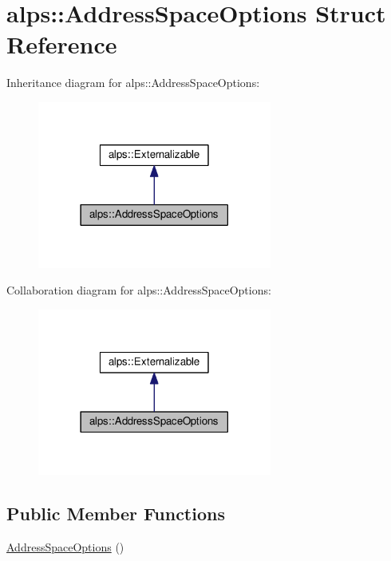 \hypertarget{structalps_1_1AddressSpaceOptions}{}\section{alps\+:\+:Address\+Space\+Options Struct Reference}
\label{structalps_1_1AddressSpaceOptions}


Inheritance diagram for alps\+:\+:Address\+Space\+Options\+:
\nopagebreak
\begin{figure}[H]
\begin{center}
\leavevmode
\includegraphics[width=218pt]{structalps_1_1AddressSpaceOptions__inherit__graph}
\end{center}
\end{figure}


Collaboration diagram for alps\+:\+:Address\+Space\+Options\+:
\nopagebreak
\begin{figure}[H]
\begin{center}
\leavevmode
\includegraphics[width=218pt]{structalps_1_1AddressSpaceOptions__coll__graph}
\end{center}
\end{figure}
\subsection*{Public Member Functions}
\begin{DoxyCompactItemize}
\item 
\hyperlink{structalps_1_1AddressSpaceOptions_a6e0027f273736238952ad058a3650c54}{Address\+Space\+Options} ()
\end{DoxyCompactItemize}
